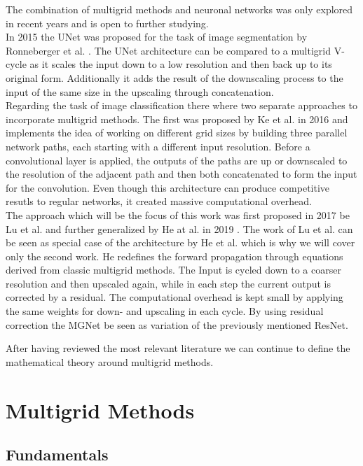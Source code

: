 \documentclass[a4paper,12pt,titlepage,enabledeprecatedfontcommands]{scrreprt}
\begin{document}
The combination of multigrid methods and neuronal networks was only explored in recent years and is open to further studying.\\
In 2015 the UNet was proposed for the task of image segmentation by Ronneberger et al. \cite{DBLP:journals/corr/RonnebergerFB15}. The UNet architecture can be compared to a multigrid V-cycle as it scales the input down to a low resolution and then back up to its original form. Additionally it adds the result of the downscaling process to the input of the same size in the upscaling through concatenation. \\
Regarding the task of image classification there where two separate approaches to incorporate multigrid methods. The first was proposed by Ke et al. in 2016 and implements the idea of working on different grid sizes by building three parallel network paths, each starting with a different input resolution. Before a convolutional layer is applied, the outputs of the paths are up or downscaled to the resolution of the adjacent path and then both concatenated to form the input for the convolution. Even though this architecture can produce competitive resutls to regular networks, it created massive computational overhead. \\
The approach which will be the focus of this work was first proposed in 2017 be Lu et al. \cite{DBLP:journals/corr/abs-1710-10121} and further generalized by He at al. in 2019 \cite{DBLP:journals/corr/abs-1901-10415}. The work of Lu et al. can be seen as special case of the architecture by He et al. which is why we will cover only the second work. He redefines the forward propagation through equations derived from classic multigrid methods. The Input is cycled down to a coarser resolution and then upscaled again, while in each step the current output is corrected by a residual. The computational overhead is kept small by applying the same weights for down- and upscaling in each cycle. By using residual correction the MGNet be seen as variation of the previously mentioned ResNet.

After having reviewed the most relevant literature we can continue to define the mathematical theory around multigrid methods.

\chapter{Multigrid Methods}
\section{Fundamentals}
\end{document}

